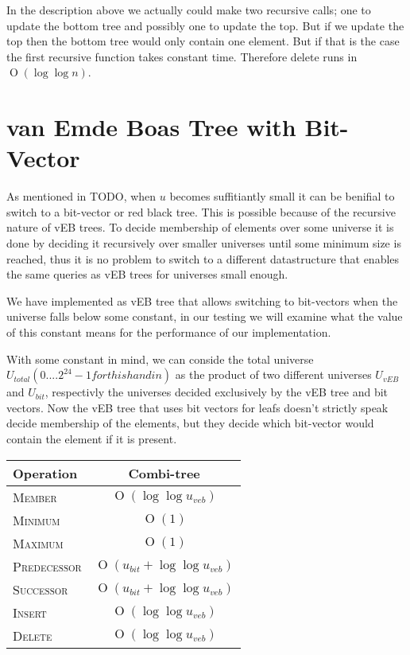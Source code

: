 \documentclass[oneside,11pt,openright]{report}
\newcommand{\BigO}[1]{\ensuremath{\operatorname{O}\left(#1\right)}}
\newcommand{\Insert}{\textsc{Insert}}
\newcommand{\Delete}{\textsc{Delete}}
\newcommand{\Member}{\textsc{Member}}
\newcommand{\Minimum}{\textsc{Minimum}}
\newcommand{\Maximum}{\textsc{Maximum}}
\newcommand{\Predecessor}{\textsc{Predecessor}}
\newcommand{\Successor}{\textsc{Successor}}
\begin{document}
In the description above we actually could make two recursive calls; one to update the bottom tree and possibly one to update the top. But if we update the top then the bottom tree would only contain one element. But if that is the case the first recursive function takes constant time. Therefore delete runs in $\BigO{\log \log n}$.

\chapter{van Emde Boas Tree with Bit-Vector}

As mentioned in TODO, when $u$ becomes suffitiantly small it can be
benifial to switch to a bit-vector or red black tree. This is possible
because of the recursive nature of vEB trees. To decide membership of
elements over some universe it is done by deciding it recursively over
smaller universes until some minimum size is reached, thus it is no
problem to switch to a different datastructure that enables the same
queries as vEB trees for universes small enough.

We have implemented as vEB tree that allows switching to bit-vectors
when the universe falls below some constant, in our testing we will
examine what the value of this constant means for the performance of
our implementation.

With some constant in mind, we can conside the total universe
$U_{total} (0....2^{24}-1 for this handin)$ as the product of two
different universes $U_{vEB}$ and $U_{bit}$, respectivly the universes
decided exclusively by the vEB tree and bit vectors. Now the vEB tree
that uses bit vectors for leafs doesn't strictly speak decide
membership of the elements, but they decide which bit-vector would
contain the element if it is present.

\begin{center}
  \begin{tabular}{ l | c }
    Operation & Combi-tree  \\ \hline
    \Member & $\BigO{ \log \log u_{veb} }$ \\ 
    \Minimum & $\BigO{1}$ \\ 
    \Maximum & $\BigO{1}$ \\ 
    \Predecessor & $\BigO{ u_{bit} + \log \log u_{veb} }$ \\ 
    \Successor & $\BigO{ u_{bit} + \log \log u_{veb} }$ \\ 
    \Insert & $\BigO{\log \log u_{veb} }$ \\ 
    \Delete & $\BigO{\log \log u_{veb} }$ \\
  \end{tabular}
\end{center}
\end{document}
